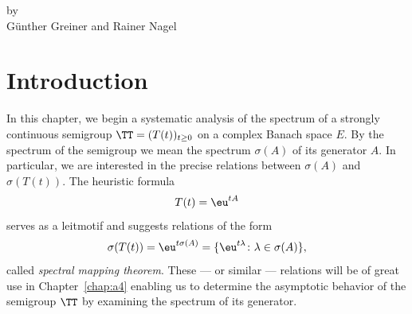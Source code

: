 \setcounter{section}{0}
\label{chap:a3}%
\pagestyle{headings}
\thispagestyle{empty}
{\Large
\vspace*{-.75cm}
by \\[.25em]
Günther Greiner and Rainer Nagel 
\vspace{.75cm}
\\
}
\section{Introduction}\label{sec:a3-1}%
In this chapter, we begin a systematic analysis of the spectrum of a strongly continuous semigroup $\TT = (T(t))_{t\geq 0}$ on a complex Banach space $E$.
By the spectrum of the semigroup we mean the spectrum $\sigma(A)$ of its generator $A$.
In particular, we are interested in the precise relations between $\sigma(A)$ and $\sigma(T(t))$.
The heuristic formula
\[
	T(t) = \eu^{tA}
\]
serves as a leitmotif and suggests relations of the form
\[
\sigma(T(t)) = \eu^{t\sigma(A)} = \{ \eu^{t\lambda} \colon \lambda \in \sigma
(A) \} ,
\]
called \emph{spectral mapping theorem}.
These --- or similar --- relations will be of great use in Chapter~\ref{chap:a4} enabling us to determine the asymptotic behavior of the semigroup $\TT$ by examining the spectrum of its generator.

